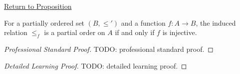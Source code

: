 \newpage
{}
\label{prf:induced-poset}

\begin{remark*}[Return]
\hyperref[prop:induced-poset]{Return to Proposition}
\end{remark*}

\begin{proposition*}
For a partially ordered set $(B,\leq')$ and a function $f:A\to B$, the induced
relation $\leq_f$ is a partial order on $A$ if and only if $f$ is injective.
\end{proposition*}

\begin{proof}[Professional Standard Proof]
\LRAProofBodyStart
TODO: professional standard proof.
\end{proof}

\begin{proof}[Detailed Learning Proof]
\LRAProofBodyStart
TODO: detailed learning proof.
\end{proof}

\begin{remark*}
\end{remark*}

\NoLocalDependencies

\clearpage

